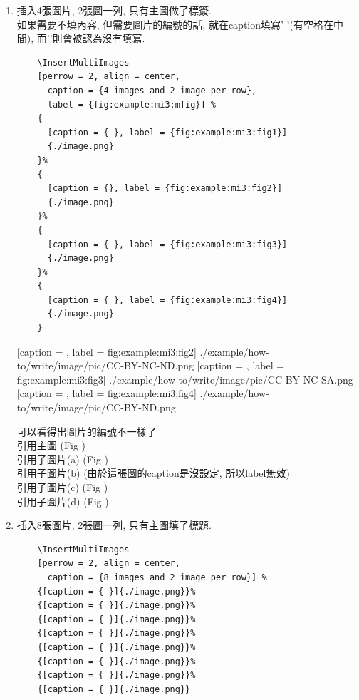\begin{enumerate}
{    e.g: 
    引用主圖 (Fig ) ,
    引用子圖片 (Fig , Fig ).
  } %

  \newpage
  \item
  {
    插入4張圖片, 2張圖一列, 只有主圖做了標簽.\\
    如果需要不填內容, 但需要圖片的編號的話, 就在caption填寫'{ }'(有空格在中間), 而'{}'則會被認為沒有填寫.
    \begin{verbatim}
    \InsertMultiImages
    [perrow = 2, align = center,
      caption = {4 images and 2 image per row},
      label = {fig:example:mi3:mfig}] %
    {
      [caption = { }, label = {fig:example:mi3:fig1}]
      {./image.png}
    }%
    {
      [caption = {}, label = {fig:example:mi3:fig2}]
      {./image.png}
    }%
    {
      [caption = { }, label = {fig:example:mi3:fig3}]
      {./image.png}
    }%
    {
      [caption = { }, label = {fig:example:mi3:fig4}]
      {./image.png}
    }
    \end{verbatim}

    {
      [caption = {},
      label = {fig:example:mi3:fig2}]
      {./example/how-to/write/image/pic/CC-BY-NC-ND.png}
    }%
    {
      [caption = { },
      label = {fig:example:mi3:fig3}]
      {./example/how-to/write/image/pic/CC-BY-NC-SA.png}
    }%
    {
      [caption = { },
      label = {fig:example:mi3:fig4}]
      {./example/how-to/write/image/pic/CC-BY-ND.png}
    }

    可以看得出圖片的編號不一樣了\\
    引用主圖 (Fig )\\
    引用子圖片(a) (Fig )\\
    引用子圖片(b) (由於這張圖的caption是沒設定, 所以label無效)\\
    引用子圖片(c) (Fig )\\
    引用子圖片(d) (Fig )
  } %

  \newpage
  \item
  {
    插入8張圖片, 2張圖一列, 只有主圖填了標題.\\
    \begin{verbatim}
    \InsertMultiImages
    [perrow = 2, align = center,
      caption = {8 images and 2 image per row}] %
    {[caption = { }]{./image.png}}%
    {[caption = { }]{./image.png}}%
    {[caption = { }]{./image.png}}%
    {[caption = { }]{./image.png}}%
    {[caption = { }]{./image.png}}%
    {[caption = { }]{./image.png}}%
    {[caption = { }]{./image.png}}%
    {[caption = { }]{./image.png}}
    \end{verbatim}

}
\end{enumerate}

